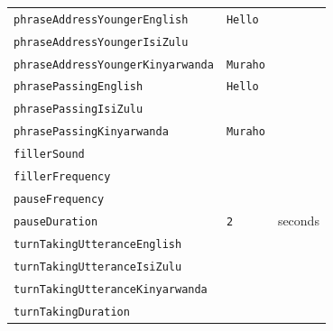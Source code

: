 \documentclass{CSSRforAfrica}
\begin{document}
\begin{table}[H]
\begin{center}
\begin{tabular}{|l l l|}
{\footnotesize \verb+phraseAddressYoungerEnglish+}     & {\footnotesize \verb+Hello+} \vspace{-1mm} & {\footnotesize  } \\
{\footnotesize \verb+phraseAddressYoungerIsiZulu+}     & {\footnotesize \verb++} \vspace{-1mm} & {\footnotesize  } \\
{\footnotesize \verb+phraseAddressYoungerKinyarwanda+}     & {\footnotesize \verb+Muraho+} \vspace{-1mm} & {\footnotesize  } \\
{\footnotesize \verb+phrasePassingEnglish+}     & {\footnotesize \verb+Hello+} \vspace{-1mm} & {\footnotesize  } \\
{\footnotesize \verb+phrasePassingIsiZulu+}     & {\footnotesize \verb++} \vspace{-1mm} & {\footnotesize  } \\
{\footnotesize \verb+phrasePassingKinyarwanda+}     & {\footnotesize \verb+Muraho+} \vspace{-1mm} & {\footnotesize  } \\
{\footnotesize \verb+fillerSound+} 	                   & {\footnotesize \verb++} \vspace{-1mm} & {\footnotesize  } \\
{\footnotesize \verb+fillerFrequency+} 	                   & {\footnotesize \verb++} \vspace{-1mm} & {\footnotesize  } \\
{\footnotesize \verb+pauseFrequency+} 	           & {\footnotesize \verb++} \vspace{-1mm} & {\footnotesize  } \\
{\footnotesize \verb+pauseDuration+} 	                    & {\footnotesize \verb+2+} \vspace{-1mm}  & {\footnotesize seconds } \\
{\footnotesize \verb+turnTakingUtteranceEnglish+} 	            & {\footnotesize \verb++ } & {\footnotesize  } \\
{\footnotesize \verb+turnTakingUtteranceIsiZulu+} 	            & {\footnotesize \verb++ } & {\footnotesize  } \\
{\footnotesize \verb+turnTakingUtteranceKinyarwanda+} 	     & {\footnotesize \verb++ } & {\footnotesize  } \\
{\footnotesize \verb+turnTakingDuration+}            & {\footnotesize \verb++ } \vspace{-1mm} & {\footnotesize  } \\

\end{tabular}
\end{center}
\end{table}
\end{document}

